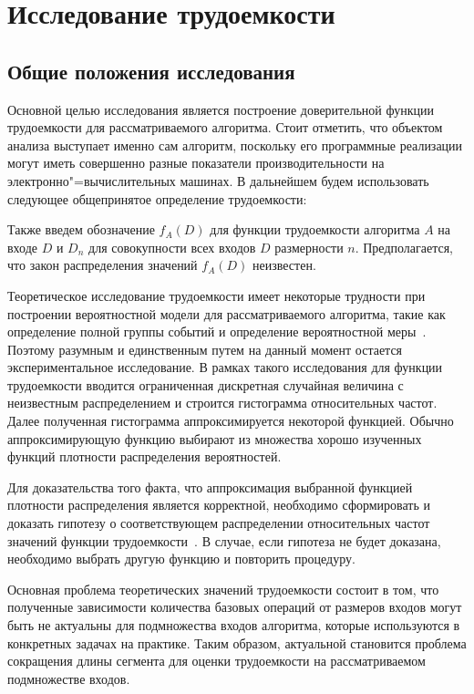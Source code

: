 \documentclass[a4paper, article, 12pt]{extarticle}
\begin{document}
\section{Исследование трудоемкости}\label{sec:complexity_research}

\subsection{Общие положения исследования}\label{sec:common_definitions}

Основной целью исследования является построение доверительной функции трудоемкости для рассматриваемого алгоритма. Стоит отметить, что объектом анализа выступает именно сам алгоритм, поскольку его программные реализации могут иметь совершенно разные показатели производительности на электронно"=вычислительных машинах. В дальнейшем будем использовать следующее общепринятое определение трудоемкости:


Также введем обозначение $f_A(D)$ для функции трудоемкости алгоритма $A$ на входе $D$ и $D_n$ для совокупности всех входов $D$ размерности $n$. Предполагается, что закон распределения значений $f_A(D)$ неизвестен.

Теоретическое исследование трудоемкости имеет некоторые трудности при построении вероятностной модели для рассматриваемого алгоритма, такие как определение полной группы событий и определение вероятностной меры~\cite{petrushyn_ulyanov_definitions}. Поэтому разумным и единственным путем на данный момент остается экспериментальное исследование. В рамках такого исследования для функции трудоемкости вводится ограниченная дискретная случайная величина с неизвестным распределением и строится гистограмма относительных частот. Далее полученная гистограмма аппроксимируется некоторой функцией. Обычно аппроксимирующую функцию выбирают из множества хорошо изученных функций плотности распределения вероятностей.

Для доказательства того факта, что аппроксимация выбранной функцией плотности распределения является корректной, необходимо сформировать и доказать гипотезу о соответствующем распределении относительных частот значений функции трудоемкости~\cite{petrushyn_ulyanov_planning}. В случае, если гипотеза не будет доказана, необходимо выбрать другую функцию и повторить процедуру.

Основная проблема теоретических значений трудоемкости состоит в том, что полученные зависимости количества базовых операций от размеров входов могут быть не актуальны для подмножества входов алгоритма, которые используются в конкретных задачах на практике. Таким образом, актуальной становится проблема сокращения длины сегмента для оценки трудоемкости на рассматриваемом подмножестве входов.
\end{document}
